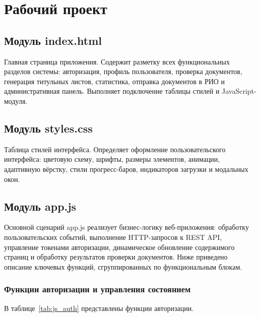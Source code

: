 \section{Рабочий проект}

\subsection{Модуль index.html}

Главная страница приложения. Содержит разметку всех функциональных разделов системы: авторизация, профиль пользователя, проверка документов, генерация титульных листов, статистика, отправка документов в РИО и административная панель. Выполняет подключение таблицы стилей и JavaScript-модуля.

\subsection{Модуль styles.css}

Таблица стилей интерфейса. Определяет оформление пользовательского интерфейса: цветовую схему, шрифты, размеры элементов, анимации, адаптивную вёрстку, стили прогресс-баров, индикаторов загрузки и модальных окон.

\subsection{Модуль app.js}

Основной сценарий app.js реализует бизнес-логику веб-приложения: обработку пользовательских событий, выполнение HTTP-запросов к REST API, управление токенами авторизации, динамическое обновление содержимого страниц и обработку результатов проверки документов. Ниже приведено описание ключевых функций, сгруппированных по функциональным блокам.

\subsubsection{Функции авторизации и управления состоянием}

В таблице~\ref{tab:js_auth} представлены функции авторизации.

